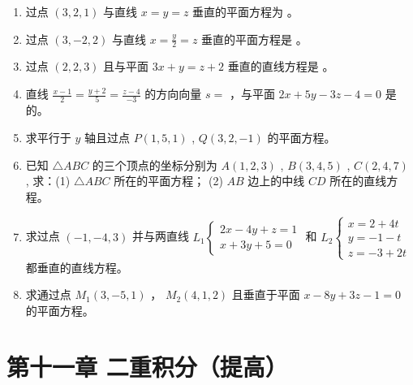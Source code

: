 \documentclass[12pt, a4paper]{article}
\newcommand{\blank}[1]{\underline{\hspace{#1}}}
\begin{document}
\begin{enumerate}
    \item 过点 $ (3,2,1) $ 与直线 $ x = y = z $ 垂直的平面方程为 \blank{2cm}。

    \item 过点 $ (3,-2,2) $ 与直线 $ x=\frac{y}{2}=z $ 垂直的平面方程是 \blank{2cm}。

    \item 过点 $ (2,2,3) $ 且与平面 $ 3x + y = z + 2 $ 垂直的直线方程是 \blank{2cm}。

    \item 直线 $ \frac{x-1}{2} = \frac{y+2}{5} = \frac{z-4}{-3} $ 的方向向量 $s=$ \blank{1.5cm}，与平面 $ 2x + 5y - 3z - 4 = 0 $ 是 \blank{1.5cm} 的。

    \item 求平行于 $y$ 轴且过点 $ P(1,5,1) $ , $ Q(3,2,-1) $ 的平面方程。

    \item 已知 $ \triangle ABC $ 的三个顶点的坐标分别为 $ A(1,2,3) $ , $ B(3,4,5) $ , $ C(2,4,7) $ ,
    求：(1) $ \triangle ABC $ 所在的平面方程；
    (2) $AB$ 边上的中线 $CD$ 所在的直线方程。

    \item 求过点 $ (-1,-4,3) $ 并与两直线 $ L_{1}\begin{cases}2x-4y+z=1\\ x+3y+5=0\end{cases} $ 和 $ L_{2}\begin{cases}x=2+4t\\ y=-1-t\\ z=-3+2t\end{cases} $ 都垂直的直线方程。

    \item 求通过点 $ M_{1}(3,-5,1) $ ， $ M_{2}(4,1,2) $ 且垂直于平面 $ x-8y+3z-1=0 $ 的平面方程。
\end{enumerate}

\section*{第十一章 二重积分（提高）}
\end{document}
